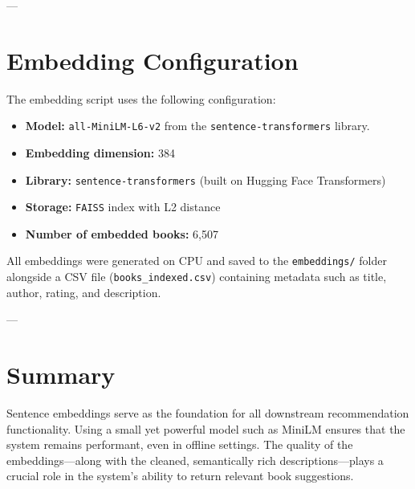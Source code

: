 ---

\section{Embedding Configuration}
\label{sec:embedding-config}

The embedding script uses the following configuration:

\begin{itemize}
    \item \textbf{Model:} \texttt{all-MiniLM-L6-v2} from the \texttt{sentence-transformers} library.
    \item \textbf{Embedding dimension:} 384
    \item \textbf{Library:} \texttt{sentence-transformers} (built on Hugging Face Transformers)
    \item \textbf{Storage:} \texttt{FAISS} index with L2 distance
    \item \textbf{Number of embedded books:} 6,507
\end{itemize}

All embeddings were generated on CPU and saved to the \texttt{embeddings/} folder alongside a CSV file (\texttt{books\_indexed.csv}) containing metadata such as title, author, rating, and description.

---

\section{Summary}
\label{sec:embedding-summary}

Sentence embeddings serve as the foundation for all downstream recommendation functionality. Using a small yet powerful model such as MiniLM ensures that the system remains performant, even in offline settings.
The quality of the embeddings—along with the cleaned, semantically rich descriptions—plays a crucial role in the system's ability to return relevant book suggestions.
